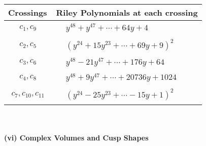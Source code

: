 \documentclass[1p]{elsarticle_modified}
\theoremstyle{definition}
\begin{document}
\begin{tabular}{m{50pt}|m{274pt}}
Crossings & \hspace{64pt}Riley Polynomials at each crossing \\
\hline $$\begin{aligned}c_{1},c_{9}\end{aligned}$$&$\begin{aligned}
&y^{48}+y^{47}+\cdots+64 y+4
\end{aligned}$\\
\hline $$\begin{aligned}c_{2},c_{5}\end{aligned}$$&$\begin{aligned}
&(y^{24}+15 y^{23}+\cdots+69 y+9)^{2}
\end{aligned}$\\
\hline $$\begin{aligned}c_{3},c_{6}\end{aligned}$$&$\begin{aligned}
&y^{48}-21 y^{47}+\cdots+176 y+64
\end{aligned}$\\
\hline $$\begin{aligned}c_{4},c_{8}\end{aligned}$$&$\begin{aligned}
&y^{48}+9 y^{47}+\cdots+20736 y+1024
\end{aligned}$\\
\hline $$\begin{aligned}c_{7},c_{10},c_{11}\end{aligned}$$&$\begin{aligned}
&(y^{24}-25 y^{23}+\cdots-15 y+1)^{2}
\end{aligned}$\\
\hline
\end{tabular}\\~\\
\newpage\flushleft \textbf{(vi) Complex Volumes and Cusp Shapes}
\end{document}
